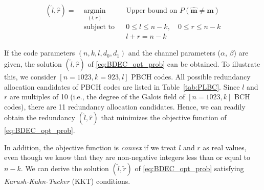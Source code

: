 \documentclass[10pt,twocolumn,twoside,submit]{JCNtran}
\begin{document}
	\begin{equation}\label{eq:BDEC_opt_prob}
	\begin{aligned}
	( \widehat{l}, \widehat{r} )  = \; & \underset{(l, r)}{\text{argmin}} & & \text{Upper bound on }P\left( \widehat{\mathbf{m}} \ne \mathbf{m} \right)  \\
		& \text{subject to} & & 0 \le l \le n - k, \quad 0 \le r \le n - k\\
		&&&  l+r = n-k 
	\end{aligned}
	\end{equation}	

	
	If the code parameters $(n, k, l, d_0, d_1)$ and the channel parameters ($\alpha$, $\beta$) are given, the solution $( \widehat{l}, \widehat{r} )$ of \eqref{eq:BDEC_opt_prob} can be obtained. To illustrate this, we consider $\left[ n = 1023, k=923, l \right]$ PBCH codes. All possible redundancy allocation candidates of PBCH codes are listed in Table~\ref{tab:PLBC}. Since $l$ and $r$ are multiples of 10 (i.e., the degree of the Galois field of $[n = 1023, k]$ BCH codes), there are 11 redundancy allocation candidates. Hence, we can readily obtain the redundancy $( \widehat{l}, \widehat{r} )$ that minimizes the objective function of \eqref{eq:BDEC_opt_prob}.
		
	In addition, the objective function is \emph{convex} if we treat $l$ and $r$ as real values, even though we know that they are non-negative integers less than or equal to $n-k$. We can derive the solution $(\widetilde{l}, \widetilde{r})$ of \eqref{eq:BDEC_opt_prob} satisfying \emph{Karush-Kuhn-Tucker} (KKT) conditions.
	
\end{document}
